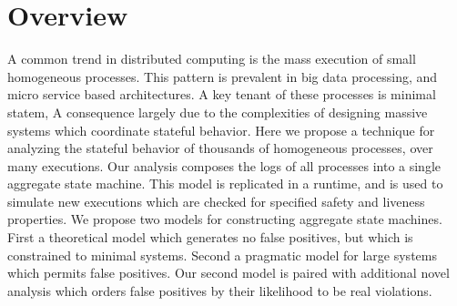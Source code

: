 \section{Overview}
\label{sec:overview}

A common trend in distributed computing is the mass execution of small
homogeneous processes. This pattern is prevalent in big data processing, and
micro service based architectures. A key tenant of these processes is minimal
statem, A consequence largely due to the complexities of designing massive
systems which coordinate stateful behavior. Here we propose a technique for
analyzing the stateful behavior of thousands of homogeneous processes, over
many executions. Our analysis composes the logs of all processes into a single
aggregate state machine. This model is replicated in a runtime, and is used to
simulate new executions which are checked for specified safety and liveness
properties. We propose two models for constructing aggregate state machines.
First a theoretical model which generates no false positives, but which is
constrained to minimal systems. Second a pragmatic model for large systems
which permits false positives. Our second model is paired with additional novel
analysis which orders false positives by their likelihood to be real
violations.


